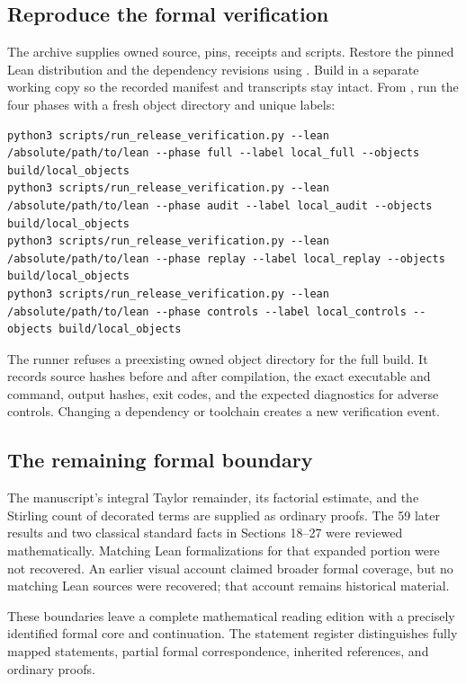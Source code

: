 \subsection*{Reproduce the formal verification}
The archive supplies owned source, pins, receipts and scripts. Restore the pinned Lean distribution and the dependency revisions using . Build in a separate working copy so the recorded manifest and transcripts stay intact. From , run the four phases with a fresh object directory and unique labels:
\begin{Verbatim}[fontsize=\small,frame=leftline,breaklines=true,breakanywhere=true]
python3 scripts/run_release_verification.py --lean /absolute/path/to/lean --phase full --label local_full --objects build/local_objects
python3 scripts/run_release_verification.py --lean /absolute/path/to/lean --phase audit --label local_audit --objects build/local_objects
python3 scripts/run_release_verification.py --lean /absolute/path/to/lean --phase replay --label local_replay --objects build/local_objects
python3 scripts/run_release_verification.py --lean /absolute/path/to/lean --phase controls --label local_controls --objects build/local_objects
\end{Verbatim}
The runner refuses a preexisting owned object directory for the full build. It records source hashes before and after compilation, the exact executable and command, output hashes, exit codes, and the expected diagnostics for adverse controls. Changing a dependency or toolchain creates a new verification event.

\subsection*{The remaining formal boundary}
The manuscript's integral Taylor remainder, its factorial estimate, and the Stirling count of decorated terms are supplied as ordinary proofs. The 59 later results and two classical standard facts in Sections 18--27 were reviewed mathematically. Matching Lean formalizations for that expanded portion were not recovered. An earlier visual account claimed broader formal coverage, but no matching Lean sources were recovered; that account remains historical material.

These boundaries leave a complete mathematical reading edition with a precisely identified formal core and continuation. The statement register distinguishes fully mapped statements, partial formal correspondence, inherited references, and ordinary proofs.
